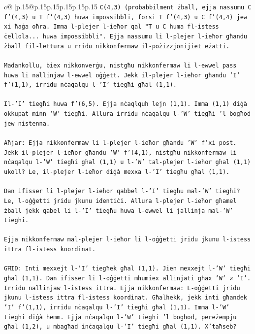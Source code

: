 \documentclass{article}
\begin{document}
{\begin{supertabular}{c@{$\;$}|p{.15\linewidth}@{}p{.15\linewidth}p{.15\linewidth}p{.15\linewidth}p{.15\linewidth}p{.15\linewidth}}
{{{\texttt{C(4,3) (probabbilment żball, ejja nassumu C f'(4,3) u T f'(4,3) huwa impossibbli, forsi T f'(4,3) u C f'(4,4) jew xi ħaġa oħra. Imma l{-}plejer l{-}ieħor qal "T u C huma fl{-}istess ċellola... huwa impossibbli". Ejja nassumu li l{-}plejer l{-}ieħor għandu żball fil{-}lettura u rridu nikkonfermaw il{-}pożizzjonijiet eżatti.} \\
\\ 
\texttt{Madankollu, biex nikkonverġu, nistgħu nikkonfermaw li l{-}ewwel pass huwa li nallinjaw l{-}ewwel oġġett. Jekk il{-}plejer l{-}ieħor għandu 'I' f'(1,1), irridu nċaqalqu l{-}'I' tiegħi għal (1,1).} \\
\\ 
\texttt{Il{-}'I' tiegħi huwa f'(6,5). Ejja nċaqlquh lejn (1,1). Imma (1,1) diġà okkupat minn 'W' tiegħi. Allura irridu nċaqalqu l{-}'W' tiegħi 'l bogħod jew nistenna.} \\
\\ 
\texttt{Aħjar: Ejja nikkonfermaw li l{-}plejer l{-}ieħor għandu 'W' f'xi post. Jekk il{-}plejer l{-}ieħor għandu 'W' f'(4,1), nistgħu nikkonfermaw li nċaqalqu l{-}'W' tiegħi għal (1,1) u l{-}'W' tal{-}plejer l{-}ieħor għal (1,1) ukoll? Le, il{-}plejer l{-}ieħor diġà mexxa l{-}'I' tiegħu għal (1,1).} \\
\\ 
\texttt{Dan ifisser li l{-}plejer l{-}ieħor qabbel l{-}'I' tiegħu mal{-}'W' tiegħi? Le, l{-}oġġetti jridu jkunu identiċi. Allura l{-}plejer l{-}ieħor għamel żball jekk qabel li l{-}'I' tiegħu huwa l{-}ewwel li jallinja mal{-}'W' tiegħi.} \\
\\ 
\texttt{Ejja nikkonfermaw mal{-}plejer l{-}ieħor li l{-}oġġetti jridu jkunu l{-}istess ittra fl{-}istess koordinat.} \\
\\ 
\texttt{GĦID: Inti mexxejt l{-}'I' tiegħek għal (1,1). Jien mexxejt l{-}'W' tiegħi għal (1,1). Dan ifisser li l{-}oġġetti mhumiex allinjati għax 'W' ≠ 'I'. Irridu nallinjaw l{-}istess ittra. Ejja nikkonfermaw: L{-}oġġetti jridu jkunu l{-}istess ittra fl{-}istess koordinat. Għalhekk, jekk inti għandek 'I' f'(1,1), irridu nċaqalqu l{-}'I' tiegħi għal (1,1). Imma l{-}'W' tiegħi diġà hemm. Ejja nċaqalqu l{-}'W' tiegħi 'l bogħod, pereżempju għal (1,2), u mbagħad inċaqalqu l{-}'I' tiegħi għal (1,1). X'taħseb?} \\
            }
        }
    }
     \\ \\


\end{supertabular}}
\end{document}
